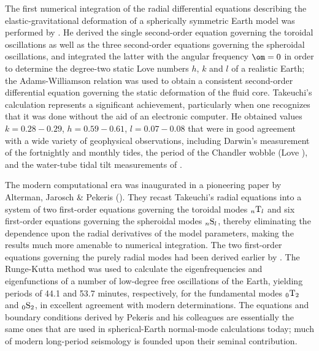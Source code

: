 The first numerical integration of the radial differential equations
describing the elastic-gravitational deformation of a spherically
symmetric Earth model was performed by \textcite{takeuchi50}.
He derived the
single second-order equation governing the toroidal oscillations as well
as the three second-order equations governing the spheroidal oscillations,
and integrated the latter with the angular frequency $\om=0$ in order
to determine the degree-two static Love numbers $h$, $k$ and $l$
%
of a realistic Earth; the Adams-Williamson relation
was used to obtain a consistent second-order differential
equation governing the static deformation of the fluid core.
%
%
Takeuchi's calculation represents a significant achievement,
particularly when one recognizes that it was done without the
aid of an electronic computer.  He obtained values
$k=0.28\!-\!0.29$, $h=0.59\!-\!0.61$, $l=0.07\!-\!0.08$
that were in good agreement with a wide variety
of geophysical observations, including Darwin's measurement of
the fortnightly and monthly tides, the period of the Chandler
wobble (Love \citeyear{love09}), and the water-tube tidal tilt
measurements of \textcite{michelson&gale19}.

The modern computational era was inaugurated in a pioneering paper
by Alterman, Jarosch \& Pekeris (\citeyear{alterman&al59}).
They recast Takeuchi's radial
equations into a system of two first-order equations governing
the toroidal modes ${}_n{\rm T}_l$
and six first-order equations governing the
spheroidal modes ${}_n{\rm S}_l$,
thereby eliminating the dependence upon the
radial derivatives of the model parameters, making the results much
more amenable to numerical integration. The two first-order
equations governing the purely radial modes had been derived
earlier by \textcite{pekeris&jarosch58}.
The Runge-Kutta method was used to
calculate the eigenfrequencies and eigenfunctions of
a number of low-degree free oscillations of the Earth,
yielding periods of 44.1 and 53.7 minutes, respectively, for
the fundamental modes ${}_0{\rm T}_2$ and ${}_0{\rm S}_2$,
in excellent agreement with modern determinations.
The equations and
boundary conditions derived by Pekeris and his colleagues
are essentially the same ones that are used in spherical-Earth
normal-mode calculations today; much of modern long-period
seismology is founded upon their seminal contribution.

